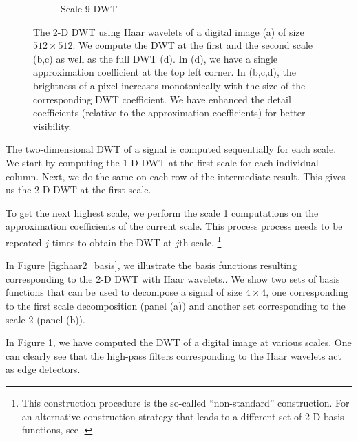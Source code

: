 \begin{figure}
\begin{subfigure}{0.4\textwidth}
  \caption{Scale 9 DWT}
\end{subfigure}
\caption[2-D Haar DWT Example]{The 2-D DWT using Haar wavelets of a digital image (a) of size $512\times 512$.
  We compute the DWT at the first and the second scale (b,c) as well as the full DWT (d).
  In (d), we have a single approximation coefficient at the top left corner.
  In (b,c,d), the brightness of a pixel increases monotonically with the size of the corresponding DWT coefficient.
  We have enhanced the detail coefficients (relative to the approximation coefficients) for better visibility.}
\label{fig:dwt2}
\end{figure}


The two-dimensional DWT of a signal is computed sequentially for each scale.
We start by computing the 1-D DWT at the first scale for each individual column.
Next, we do the same on each row of the intermediate result.
This gives us the 2-D DWT at the first scale.

To get the next highest scale, we perform the scale 1 computations on the approximation coefficients of the current scale.
This process process needs to be repeated $j$ times to obtain the DWT at $j$th scale.
\footnote{
  This construction procedure is the so-called ``non-standard'' construction.
  For an alternative construction strategy that leads to a different set of 2-D basis functions, see \cite{stollnitz1995}.
}

In Figure \ref{fig:haar2_basis}, we illustrate the basis functions resulting corresponding to the 2-D DWT with Haar wavelets..
We show two sets of basis functions that can be used to decompose a signal of size $4\times 4$, one corresponding to the first scale decomposition (panel (a)) and another set corresponding to the scale 2 (panel (b)).

In Figure \ref{fig:dwt2}, we have computed the DWT of a digital image at various scales. 
One can clearly see that the high-pass filters corresponding to the Haar wavelets act as edge detectors.


